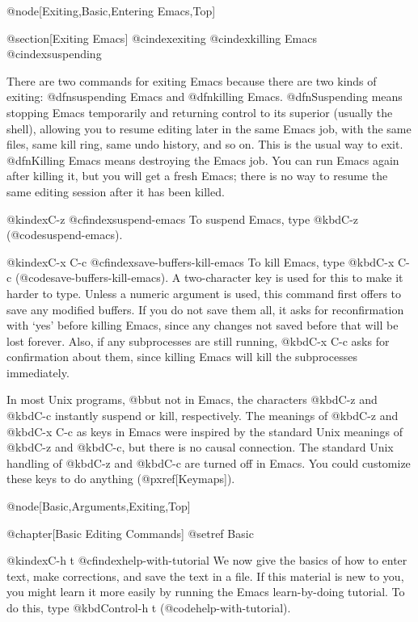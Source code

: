 {{{@node[Exiting,Basic,Entering Emacs,Top]

@section[Exiting Emacs]
@cindex{exiting}
@cindex{killing Emacs}
@cindex{suspending}

  There are two commands for exiting Emacs because there are two kinds of
exiting: @dfn{suspending} Emacs and @dfn{killing} Emacs.  @dfn{Suspending}
means stopping Emacs temporarily and returning control to its superior
(usually the shell), allowing you to resume editing later in the same
Emacs job, with the same files, same kill ring, same undo history, and
so on.  This is the usual way to exit.  @dfn{Killing} Emacs means destroying
the Emacs job.  You can run Emacs again after killing it, but you will get
a fresh Emacs; there is no way to resume the same editing session after
it has been killed.

@kindex{C-z}
@cfindex{suspend-emacs}
  To suspend Emacs, type @kbd{C-z} (@code{suspend-emacs}).

@kindex{C-x C-c}
@cfindex{save-buffers-kill-emacs}
  To kill Emacs, type @kbd{C-x C-c} (@code{save-buffers-kill-emacs}).
A two-character key is used for this to make it harder to type.
Unless a numeric argument is used, this command first offers to save
any modified buffers.  If you do not save them all, it asks for
reconfirmation with `yes' before killing Emacs, since any changes not
saved before that will be lost forever.  Also, if any subprocesses are
still running, @kbd{C-x C-c} asks for confirmation about them, since
killing Emacs will kill the subprocesses immediately.

  In most Unix programs, @b{but not in Emacs}, the characters
@kbd{C-z} and @kbd{C-c} instantly suspend or kill, respectively.  The
meanings of @kbd{C-z} and @kbd{C-x C-c} as keys in Emacs were inspired by
the standard Unix meanings of @kbd{C-z} and @kbd{C-c}, but there is no
causal connection.  The standard Unix handling of @kbd{C-z} and
@kbd{C-c} are turned off in Emacs.  You could customize these
keys to do anything (@pxref[Keymaps]).

@node[Basic,Arguments,Exiting,Top]

@chapter[Basic Editing Commands]
@setref Basic

@kindex{C-h t}
@cfindex{help-with-tutorial}
  We now give the basics of how to enter text, make corrections, and
save the text in a file.  If this material is new to you, you might
learn it more easily by running the Emacs learn-by-doing tutorial.  To
do this, type @kbd{Control-h t} (@code{help-with-tutorial}).

}}}
